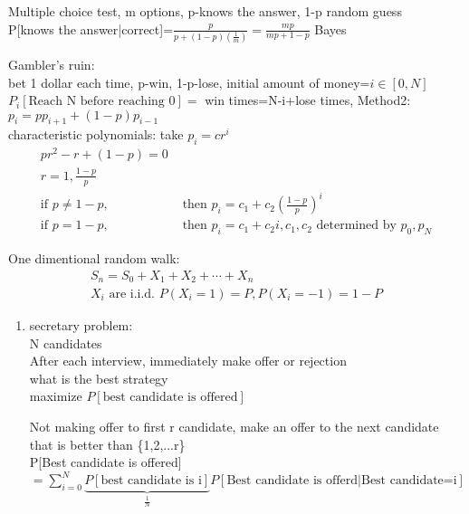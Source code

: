  \begin{example}[]{}
  Multiple choice test, m options, p-knows the answer, 1-p random guess\\
  P[knows the answer|correct]=$ \frac{p}{p+(1-p)(\frac{1}{m})}=\frac{mp}{mp+1-p} $ Bayes
 \end{example}
 \begin{example}[]{}
  Gambler's ruin:
  \\ bet 1 dollar each time, p-win, 1-p-lose, initial amount of money=$ i\in[0,N] $
  \\$ P_i[\text{Reach N before reaching 0}]= $  win times=N-i+lose times,
  Method2: $ p_i=pp_{i+1}+(1-p)p_{i-1} $
  \\characteristic polynomials: take $p_i=cr^i $
  \begin{align*}{}{}
  pr^2-r+(1-p)=0\\
  r=1,\frac{1-p}{p}\\
  \text{if }p\neq 1-p,&\text{ then }p_i=c_1+c_2(\frac{1-p}{p})^i\\
    \text{if }p=1-p,&\text{ then }p_i=c_1+c_2i, c_1,c_2\text{ determined by }p_0 ,p_N
  \end{align*} 
 \end{example}
 One dimentional random walk:
 \begin{align*}{}{}
 S_n=S_0+X_1+X_2+\cdots+X_n\\
    X_i\text{ are i.i.d. } P(X_i=1)=P,P(X_i=-1)=1-P
    \end{align*}
    \begin{example}[]{}
        \begin{enumerate}[label=\circled{\arabic*}] 
            \item secretary problem:
    \\N candidates
    \\After each interview, immediately make offer or rejection
    \\what is the best strategy
    \\maximize $ P[\text{best candidate is offered}] $ 
    \begin{solution}
        Not making offer to first r candidate, make an offer to the next candidate that is better than \{1,2,...r\}
        \\ P[{Best candidate is offered}]\\$=\sum_{i=0}^{N}\underbrace{P[\text{best candidate is i}]}_{\frac{1}{N}}P[\text{Best candidate is offerd|Best candidate=i}] $ 
    \end{solution}
         \end{enumerate}
    \end{example}
